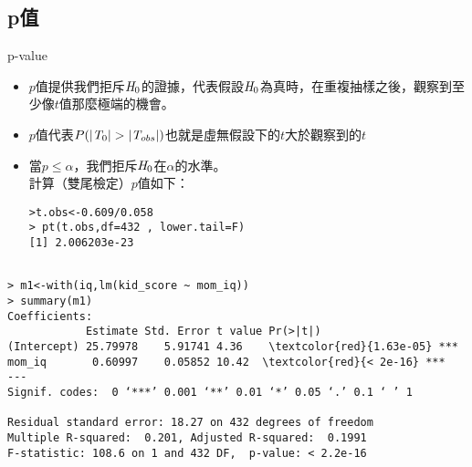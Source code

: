 \documentclass[xcolor=dvipsnames]{beamer}
\begin{document}
\subsection{p值}
\begin{frame}[fragile=singleslide]{p-value}
\begin{itemize}
\item $p$值提供我們拒斥$\emph{H}_{0}$的證據，代表假設$\emph{H}_{0}$為真時，在重複抽樣之後，觀察到至少像$t$值那麼極端的機會。
\item $p$值代表$P(|\emph{T}_{0}|>|\emph{T}_{obs}|)$也就是虛無假設下的$t$大於觀察到的$t$
\item 當$p\leq \alpha$，我們拒斥$\emph{H}_{0}$在$\alpha$的水準。\\
計算（雙尾檢定）$p$值如下：
\medskip
\begin{Verbatim}[frame=single,label=R code,
fontseries=b,xleftmargin=2mm,commandchars=\\\{\},
formatcom=\color{blue}]
>t.obs<-0.609/0.058
> pt(t.obs,df=432 , lower.tail=F)
[1] 2.006203e-23
\end{Verbatim}
\end{itemize}
\end{frame}
\begin{frame}[fragile=singleslide]
\begin{Verbatim}[frame=single,label=R code,
fontseries=b,xleftmargin=2mm,commandchars=\\\{\},
formatcom=\color{blue}]

> m1<-with(iq,lm(kid_score ~ mom_iq))
> summary(m1)
Coefficients:
            Estimate Std. Error t value Pr(>|t|)    
(Intercept) 25.79978    5.91741 4.36    \textcolor{red}{1.63e-05} ***
mom_iq       0.60997    0.05852 10.42  \textcolor{red}{< 2e-16} ***
---
Signif. codes:  0 ‘***’ 0.001 ‘**’ 0.01 ‘*’ 0.05 ‘.’ 0.1 ‘ ’ 1

Residual standard error: 18.27 on 432 degrees of freedom
Multiple R-squared:  0.201,	Adjusted R-squared:  0.1991 
F-statistic: 108.6 on 1 and 432 DF,  p-value: < 2.2e-16
\end{Verbatim}
\end{frame}
\end{document}
